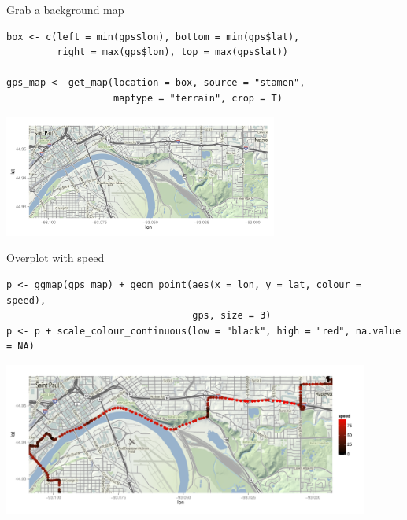 \documentclass[sans,aspectratio=169,presentation,bigger,fleqn]{beamer}
\begin{document}
\begin{frame}[fragile,label=sec-26]{Grab a background map}
 \scriptsize

\begin{verbatim}
box <- c(left = min(gps$lon), bottom = min(gps$lat),
         right = max(gps$lon), top = max(gps$lat))

gps_map <- get_map(location = box, source = "stamen",
                   maptype = "terrain", crop = T)
\end{verbatim}

\begin{center}
\includegraphics[height=4cm]{./img/gps-map.pdf}
\end{center}
\end{frame}
\begin{frame}[fragile,label=sec-27]{Overplot with speed}
 \scriptsize

\begin{verbatim}
p <- ggmap(gps_map) + geom_point(aes(x = lon, y = lat, colour = speed),
                                 gps, size = 3)
p <- p + scale_colour_continuous(low = "black", high = "red", na.value = NA)
\end{verbatim}

\begin{center}
\includegraphics[height=5cm]{./img/gps-map-over.pdf}
\end{center}

\normalsize
\end{frame}
\end{document}
